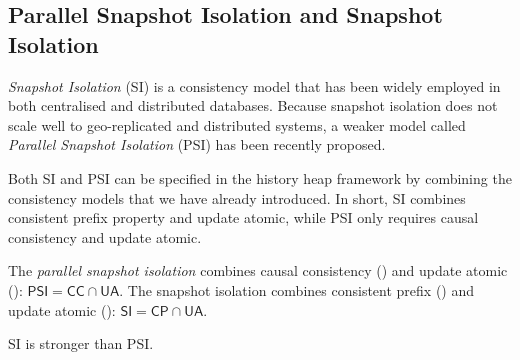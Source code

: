 \subsection{Parallel Snapshot Isolation and Snapshot Isolation}
\emph{Snapshot Isolation} (SI) is a consistency model that has been widely employed in both centralised and distributed databases. 
Because snapshot isolation does not scale well to geo-replicated and distributed systems, a weaker model called \emph{Parallel Snapshot Isolation} (PSI) has been recently proposed. 

Both SI and PSI can be specified in the history heap framework by combining the consistency models that we have already introduced. 
In short, SI combines consistent prefix property and update atomic, while PSI only requires causal consistency and update atomic.
\begin{defn}
The \emph{parallel snapshot isolation} combines causal consistency ()  and update atomic (): $\mathsf{PSI} = \mathsf{CC} \cap \mathsf{UA}$.
The {snapshot isolation} combines consistent prefix () and update atomic (): $\mathsf{SI} = \mathsf{CP} \cap \mathsf{UA}$.
\end{defn}

\begin{lem}
SI is stronger than PSI.
\end{lem}

